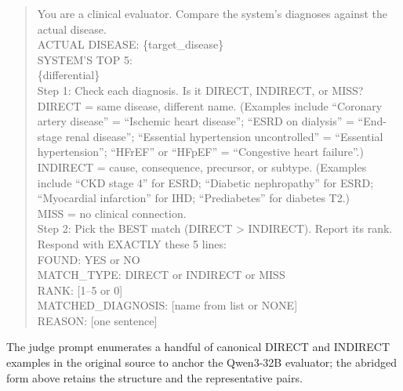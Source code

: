 \begin{quote}\footnotesize\ttfamily
You are a clinical evaluator. Compare the system's diagnoses against
the actual disease.\\[0.3em]
ACTUAL DISEASE: \{target\_disease\}\\[0.3em]
SYSTEM'S TOP 5:\\
\{differential\}\\[0.3em]
Step 1: Check each diagnosis. Is it DIRECT, INDIRECT, or MISS?\\[0.3em]
DIRECT = same disease, different name. (Examples include
``Coronary artery disease'' = ``Ischemic heart disease'';
``ESRD on dialysis'' = ``End-stage renal disease'';
``Essential hypertension uncontrolled'' = ``Essential hypertension'';
``HFrEF'' or ``HFpEF'' = ``Congestive heart failure''.)\\[0.3em]
INDIRECT = cause, consequence, precursor, or subtype. (Examples
include ``CKD stage 4'' for ESRD; ``Diabetic nephropathy'' for ESRD;
``Myocardial infarction'' for IHD; ``Prediabetes'' for diabetes T2.)\\[0.3em]
MISS = no clinical connection.\\[0.3em]
Step 2: Pick the BEST match (DIRECT > INDIRECT). Report its rank.\\[0.3em]
Respond with EXACTLY these 5 lines:\\
FOUND: YES or NO\\
MATCH\_TYPE: DIRECT or INDIRECT or MISS\\
RANK: [1--5 or 0]\\
MATCHED\_DIAGNOSIS: [name from list or NONE]\\
REASON: [one sentence]
\end{quote}

The judge prompt enumerates a handful of canonical DIRECT and
INDIRECT examples in the original source to anchor the Qwen3-32B
evaluator; the abridged form above retains the structure and the
representative pairs.

